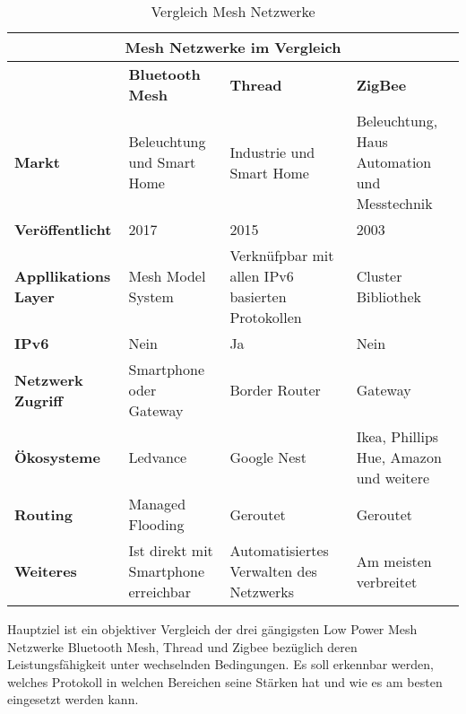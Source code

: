 \begin{table}[h]
	\centering
	\begin{adjustbox}{width=1\textwidth}
		\begin{tabular}{@{}|l|l|l|l|@{}}
			\toprule
			\multicolumn{4}{|c|}{\textbf{Mesh Netzwerke im Vergleich}}                                                                                                            \\ \midrule
			& \textbf{Bluetooth Mesh}              & \textbf{Thread}                                  & \textbf{ZigBee}                              \\ \midrule
			\textbf{Markt}               & Beleuchtung und Smart Home           & Industrie und Smart Home                         & Beleuchtung, Haus Automation und Messtechnik \\ \midrule
			\textbf{Veröffentlicht}      & 2017                                 & 2015                                             & 2003                                         \\ \midrule
			\textbf{Appllikations Layer} & Mesh Model System                    & Verknüfpbar mit allen IPv6 basierten Protokollen & Cluster Bibliothek                           \\ \midrule
			\textbf{IPv6}                & Nein                                 & Ja                                               & Nein                                         \\ \midrule
			\textbf{Netzwerk Zugriff}    & Smartphone oder Gateway              & Border Router                                    & Gateway                                      \\ \midrule
			\textbf{Ökosysteme}          & Ledvance                             & Google Nest                                      & Ikea, Phillips Hue, Amazon und weitere       \\ \midrule
			\textbf{Routing}             & Managed Flooding                     & Geroutet                                         & Geroutet                                     \\ \midrule
			\textbf{Weiteres}            & Ist direkt mit Smartphone erreichbar & Automatisiertes Verwalten des Netzwerks          & Am meisten verbreitet                        \\ \bottomrule
		\end{tabular}
	\end{adjustbox}
	\caption{Vergleich Mesh Netzwerke}\label{table:VergleichMeshNetzwerk}
\end{table}

Hauptziel ist ein objektiver Vergleich der drei gängigsten Low Power Mesh Netzwerke Bluetooth Mesh, Thread und Zigbee bezüglich deren Leistungsfähigkeit unter wechselnden Bedingungen. Es soll erkennbar werden, welches Protokoll in welchen Bereichen seine Stärken hat und wie es am besten eingesetzt werden kann.

